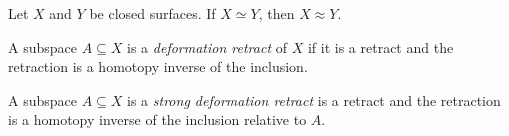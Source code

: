 \begin{izrek}
Let $X$ and $Y$ be closed surfaces. If $X \simeq Y$, then
$X \approx Y$.
\end{izrek}

\begin{definicija}
A subspace $A \subseteq X$ is a
\emph{deformation retract} of $X$ if it
is a retract and the retraction is a homotopy inverse of the
inclusion.
\end{definicija}

\begin{definicija}
A subspace $A \subseteq X$ is a
\emph{strong deformation retract}
is a retract and the retraction is a homotopy inverse of the
inclusion relative to $A$.
\end{definicija}
